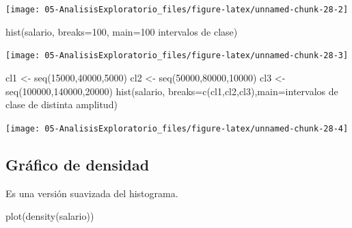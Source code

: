 \documentclass[
]{book}
\newenvironment{Shaded}{\begin{snugshade}}{\end{snugshade}}
\newcommand{\AttributeTok}[1]{\textcolor[rgb]{0.77,0.63,0.00}{#1}}
\newcommand{\DecValTok}[1]{\textcolor[rgb]{0.00,0.00,0.81}{#1}}
\newcommand{\FunctionTok}[1]{\textcolor[rgb]{0.00,0.00,0.00}{#1}}
\newcommand{\NormalTok}[1]{#1}
\newcommand{\OtherTok}[1]{\textcolor[rgb]{0.56,0.35,0.01}{#1}}
\newcommand{\StringTok}[1]{\textcolor[rgb]{0.31,0.60,0.02}{#1}}
\theoremstyle{break}
\theoremstyle{nonumberplain}
\begin{document}
\begin{center}\texttt{[image: 05-AnalisisExploratorio\_files/figure-latex/unnamed-chunk-28-2]} \end{center}

\begin{Shaded}
\begin{Highlighting}[]
\FunctionTok{hist}\NormalTok{(salario, }\AttributeTok{breaks=}\DecValTok{100}\NormalTok{, }\AttributeTok{main=}\StringTok{\textquotesingle{}100 intervalos de clase\textquotesingle{}}\NormalTok{)}
\end{Highlighting}
\end{Shaded}

\begin{center}\texttt{[image: 05-AnalisisExploratorio\_files/figure-latex/unnamed-chunk-28-3]} \end{center}

\begin{Shaded}
\begin{Highlighting}[]
\NormalTok{cl1 }\OtherTok{\textless{}{-}} \FunctionTok{seq}\NormalTok{(}\DecValTok{15000}\NormalTok{,}\DecValTok{40000}\NormalTok{,}\DecValTok{5000}\NormalTok{)}
\NormalTok{cl2 }\OtherTok{\textless{}{-}} \FunctionTok{seq}\NormalTok{(}\DecValTok{50000}\NormalTok{,}\DecValTok{80000}\NormalTok{,}\DecValTok{10000}\NormalTok{)}
\NormalTok{cl3 }\OtherTok{\textless{}{-}} \FunctionTok{seq}\NormalTok{(}\DecValTok{100000}\NormalTok{,}\DecValTok{140000}\NormalTok{,}\DecValTok{20000}\NormalTok{)}
\FunctionTok{hist}\NormalTok{(salario, }\AttributeTok{breaks=}\FunctionTok{c}\NormalTok{(cl1,cl2,cl3),}\AttributeTok{main=}\StringTok{\textquotesingle{}intervalos de clase de distinta amplitud\textquotesingle{}}\NormalTok{)}
\end{Highlighting}
\end{Shaded}

\begin{center}\texttt{[image: 05-AnalisisExploratorio\_files/figure-latex/unnamed-chunk-28-4]} \end{center}

\hypertarget{gruxe1fico-de-densidad}{%
\subsection{Gráfico de densidad}\label{gruxe1fico-de-densidad}}

Es una versión suavizada del histograma.

\begin{Shaded}
\begin{Highlighting}[]
\FunctionTok{plot}\NormalTok{(}\FunctionTok{density}\NormalTok{(salario))}
\end{Highlighting}
\end{Shaded}
\end{document}
